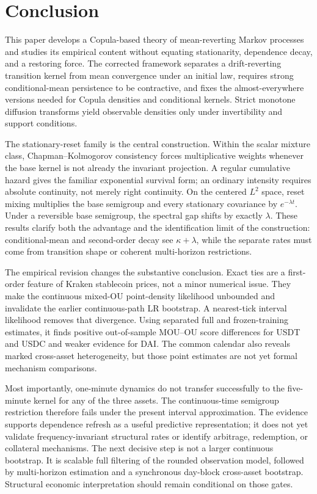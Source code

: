 \section{Conclusion}
\label{sec:conclusion}

This paper develops a Copula-based theory of mean-reverting Markov processes
and studies its empirical content without equating stationarity, dependence
decay, and a restoring force.  The corrected framework separates a
drift-reverting transition kernel from mean convergence under an initial law,
requires strong conditional-mean persistence to be contractive, and fixes the
almost-everywhere versions needed for Copula densities and conditional kernels.
Strict monotone diffusion transforms yield observable densities only under
invertibility and support conditions.

The stationary-reset family is the central construction.  Within the scalar
mixture class, Chapman--Kolmogorov consistency forces multiplicative weights
whenever the base kernel is not already the invariant projection.  A regular
cumulative hazard gives the familiar exponential survival form; an ordinary
intensity requires absolute continuity, not merely right continuity.  On the
centered $L^2$ space, reset mixing multiplies the base semigroup and every
stationary covariance by $e^{-\lambda t}$.  Under a reversible base semigroup,
the spectral gap shifts by exactly $\lambda$.  These results clarify both the
advantage and the identification limit of the construction: conditional-mean
and second-order decay see $\kappa+\lambda$, while the separate rates must come
from transition shape or coherent multi-horizon restrictions.

The empirical revision changes the substantive conclusion.  Exact ties are a
first-order feature of Kraken stablecoin prices, not a minor numerical issue.
They make the continuous mixed-OU point-density likelihood unbounded and
invalidate the earlier continuous-path LR bootstrap.  A nearest-tick interval
likelihood removes that divergence.  Using separated full and frozen-training
estimates, it finds positive out-of-sample MOU--OU score differences for USDT
and USDC and weaker evidence for DAI.  The common calendar also reveals marked
cross-asset heterogeneity, but those point estimates are not yet formal
mechanism comparisons.

Most importantly, one-minute dynamics do not transfer successfully to the
five-minute kernel for any of the three assets.  The continuous-time semigroup
restriction therefore fails under the present interval approximation.  The
evidence supports dependence refresh as a useful predictive representation;
it does not yet validate frequency-invariant structural rates or identify
arbitrage, redemption, or collateral mechanisms.  The next decisive step is
not a larger continuous bootstrap.  It is scalable full filtering of the
rounded observation model, followed by multi-horizon estimation and a
synchronous day-block cross-asset bootstrap.  Structural economic
interpretation should remain conditional on those gates.
